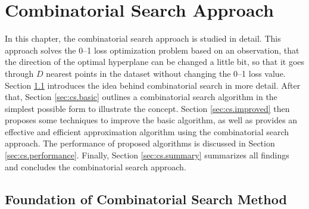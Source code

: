 \section{Combinatorial Search Approach}
\label{cha:combinatorialsearch}

In this chapter, the combinatorial search approach is studied in detail. This approach solves the 0--1 loss optimization problem based on an observation, that the direction of the optimal hyperplane can be changed a little bit, so that it goes through $D$ nearest points in the dataset without changing the 0--1 loss value. Section \ref{sec:cs.foundation} introduces the idea behind combinatorial search in more detail. After that, Section \ref{sec:cs.basic} outlines a combinatorial search algorithm in the simplest possible form to illustrate the concept. Section \ref{sec:cs.improved} then proposes some techniques to improve the basic algorithm, as well as provides an effective and efficient approximation algorithm using the combinatorial search approach. The performance of proposed algorithms is discussed in Section \ref{sec:cs.performance}. Finally, Section \ref{sec:cs.summary} summarizes all findings and concludes the combinatorial search approach.


\subsection{Foundation of Combinatorial Search Method}
\label{sec:cs.foundation}

